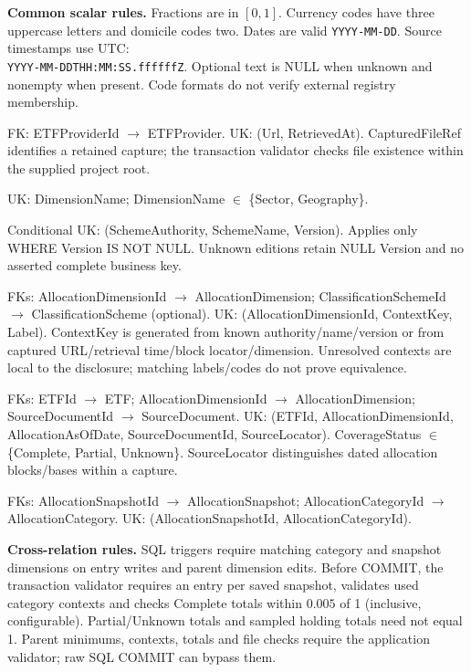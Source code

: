 \par\smallskip\noindent\textbf{Common scalar rules.}
Fractions are in $[0,1]$. Currency codes have three uppercase letters and domicile
codes two. Dates are valid \texttt{YYYY-MM-DD}. Source timestamps use UTC:\\
\texttt{YYYY-MM-DDTHH:MM:SS.ffffffZ}. Optional text is NULL when unknown and
nonempty when present. Code formats do not verify external registry membership.

\newpage

FK: ETFProviderId $\rightarrow$ ETFProvider.
UK: (Url, RetrievedAt).
CapturedFileRef identifies a retained capture; the transaction validator checks
file existence within the supplied project root.

UK: DimensionName; DimensionName $\in$ \{Sector, Geography\}.

Conditional UK: (SchemeAuthority, SchemeName, Version).
Applies only WHERE Version IS NOT NULL.
Unknown editions retain NULL Version and no asserted complete business key.

FKs: AllocationDimensionId $\rightarrow$ AllocationDimension;
ClassificationSchemeId $\rightarrow$ ClassificationScheme (optional).
UK: (AllocationDimensionId, ContextKey, Label).
ContextKey is generated from known authority/name/version or from captured
URL/retrieval time/block locator/dimension. Unresolved contexts are local to the
disclosure; matching labels/codes do not prove equivalence.

FKs: ETFId $\rightarrow$ ETF;
AllocationDimensionId $\rightarrow$ AllocationDimension;
SourceDocumentId $\rightarrow$ SourceDocument.
UK: (ETFId, AllocationDimensionId, AllocationAsOfDate, SourceDocumentId, SourceLocator).
CoverageStatus $\in$ \{Complete, Partial, Unknown\}.
SourceLocator distinguishes dated allocation blocks/bases within a capture.

FKs: AllocationSnapshotId $\rightarrow$ AllocationSnapshot;
AllocationCategoryId $\rightarrow$ AllocationCategory.
UK: (AllocationSnapshotId, AllocationCategoryId).

\par\smallskip\noindent\textbf{Cross-relation rules.}
SQL triggers require matching category and snapshot dimensions on entry writes and
parent dimension edits. Before COMMIT, the transaction validator requires an
entry per saved snapshot, validates used category contexts and checks Complete
totals within $0.005$ of 1 (inclusive, configurable). Partial/Unknown totals and
sampled holding totals need not equal 1. Parent minimums, contexts, totals and
file checks require the application validator; raw SQL COMMIT can bypass them.
\endgroup
